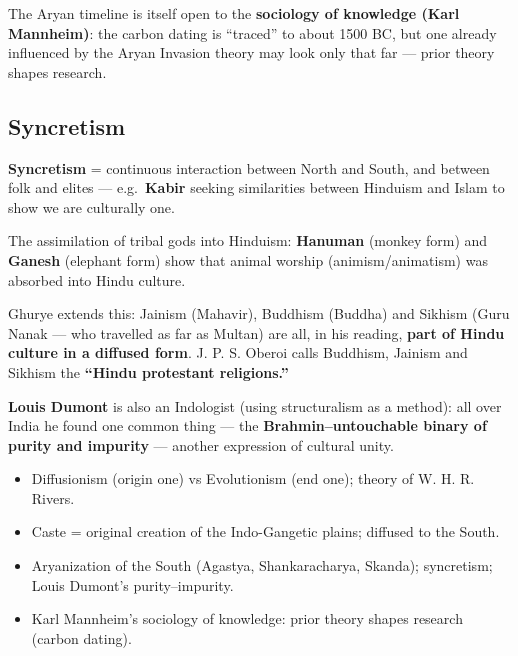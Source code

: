 \begin{CriticalPoint}
The Aryan timeline is itself open to the \textbf{sociology of knowledge (Karl Mannheim)}: the carbon dating is ``traced'' to about 1500 BC, but one already influenced by the Aryan Invasion theory may look only that far --- prior theory shapes research.
\end{CriticalPoint}

\subsection{Syncretism}

\textbf{Syncretism} = continuous interaction between North and South, and between folk and elites --- e.g.\ \textbf{Kabir} seeking similarities between Hinduism and Islam to show we are culturally one.

\begin{ExampleBox}
The assimilation of tribal gods into Hinduism: \textbf{Hanuman} (monkey form) and \textbf{Ganesh} (elephant form) show that animal worship (animism/animatism) was absorbed into Hindu culture.
\end{ExampleBox}

Ghurye extends this: Jainism (Mahavir), Buddhism (Buddha) and Sikhism (Guru Nanak --- who travelled as far as Multan) are all, in his reading, \textbf{part of Hindu culture in a diffused form}. J. P. S. Oberoi calls Buddhism, Jainism and Sikhism the \textbf{``Hindu protestant religions.''}

\textbf{Louis Dumont} is also an Indologist (using structuralism as a method): all over India he found one common thing --- the \textbf{Brahmin--untouchable binary of purity and impurity} --- another expression of cultural unity.

\begin{QuickRevision}
\begin{itemize}
\item Diffusionism (origin one) vs Evolutionism (end one); theory of W. H. R. Rivers.
\item Caste = original creation of the Indo-Gangetic plains; diffused to the South.
\item Aryanization of the South (Agastya, Shankaracharya, Skanda); syncretism; Louis Dumont's purity--impurity.
\item Karl Mannheim's sociology of knowledge: prior theory shapes research (carbon dating).
\end{itemize}
\end{QuickRevision}

